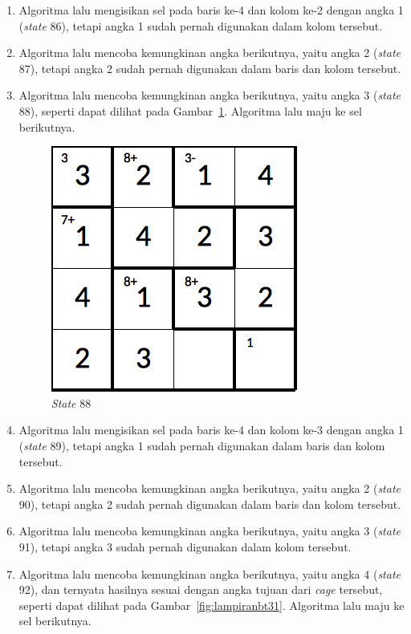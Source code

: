 \begin{enumerate}
\item Algoritma lalu mengisikan sel pada baris ke-4 dan kolom ke-2 dengan angka 1 (\textit{state} 86), tetapi angka 1 sudah pernah digunakan dalam kolom tersebut.
\item Algoritma lalu mencoba kemungkinan angka berikutnya, yaitu angka 2 (\textit{state} 87), tetapi angka 2 sudah pernah digunakan dalam baris dan kolom tersebut.
\item Algoritma lalu mencoba kemungkinan angka berikutnya, yaitu angka 3 (\textit{state} 88), seperti dapat dilihat pada Gambar~\ref{fig:lampiranbt30}. Algoritma lalu maju ke sel berikutnya.

\begin{figure}
\centering
\captionsetup{justification=centering}
\includegraphics[scale=0.333]{Gambar/backtracking/State88}
\caption[\textit{State} 88]{\textit{State} 88}
\label{fig:lampiranbt30}
\end{figure}

\item Algoritma lalu mengisikan sel pada baris ke-4 dan kolom ke-3 dengan angka 1 (\textit{state} 89), tetapi angka 1 sudah pernah digunakan dalam baris dan kolom tersebut.
\item Algoritma lalu mencoba kemungkinan angka berikutnya, yaitu angka 2 (\textit{state} 90), tetapi angka 2 sudah pernah digunakan dalam baris dan kolom tersebut.
\item Algoritma lalu mencoba kemungkinan angka berikutnya, yaitu angka 3 (\textit{state} 91), tetapi angka 3 sudah pernah digunakan dalam kolom tersebut.
\item Algoritma lalu mencoba kemungkinan angka berikutnya, yaitu angka 4 (\textit{state} 92), dan ternyata hasilnya sesuai dengan angka tujuan dari \textit{cage} tersebut, seperti dapat dilihat pada Gambar~\ref{fig:lampiranbt31}. Algoritma lalu maju ke sel berikutnya.


\end{enumerate}
